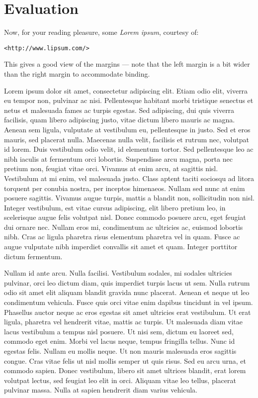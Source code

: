 \chapter{Evaluation}
\label{chap:evaluation}


Now, for your reading pleasure, some \textsl{Lorem ipsum}, courtesy
of:
\begin{center}
\texttt{<http://www.lipsum.com/>}
\end{center}
This gives a good view of the margins --- note that the left margin
is a bit wider than the right margin to accommodate binding.

Lorem ipsum dolor sit amet, consectetur adipiscing elit. Etiam odio elit,
viverra eu tempor non, pulvinar ac nisi. Pellentesque habitant morbi
tristique senectus et netus et malesuada fames ac turpis egestas. Sed
adipiscing, dui quis viverra facilisis, quam libero adipiscing justo,
vitae dictum libero mauris ac magna. Aenean sem ligula, vulputate at
vestibulum eu, pellentesque in justo. Sed et eros mauris, sed placerat
nulla. Maecenas nulla velit, facilisis et rutrum nec, volutpat id
lorem. Duis vestibulum odio velit, id elementum tortor. Sed pellentesque
leo ac nibh iaculis at fermentum orci lobortis. Suspendisse arcu magna,
porta nec pretium non, feugiat vitae orci. Vivamus at enim arcu,
at sagittis nisl. Vestibulum at mi enim, vel malesuada justo. Class
aptent taciti sociosqu ad litora torquent per conubia nostra, per
inceptos himenaeos. Nullam sed nunc at enim posuere sagittis. Vivamus
augue turpis, mattis a blandit non, sollicitudin non nisl. Integer
vestibulum, est vitae cursus adipiscing, elit libero pretium leo,
in scelerisque augue felis volutpat nisl. Donec commodo posuere arcu,
eget feugiat dui ornare nec. Nullam eros mi, condimentum ac ultricies ac,
euismod lobortis nibh. Cras ac ligula pharetra risus elementum pharetra
vel in quam. Fusce ac augue vulputate nibh imperdiet convallis sit amet
et quam. Integer porttitor dictum fermentum.

Nullam id ante arcu. Nulla facilisi. Vestibulum sodales, mi sodales
ultricies pulvinar, orci leo dictum diam, quis imperdiet turpis lacus
ut sem. Nulla rutrum odio sit amet elit aliquam blandit gravida nunc
placerat. Aenean et neque ut leo condimentum vehicula. Fusce quis orci
vitae enim dapibus tincidunt in vel ipsum. Phasellus auctor neque ac eros
egestas sit amet ultricies erat vestibulum. Ut erat ligula, pharetra
vel hendrerit vitae, mattis ac turpis. Ut malesuada diam vitae lacus
vestibulum a tempus nisl posuere. Ut nisi sem, dictum eu laoreet sed,
commodo eget enim. Morbi vel lacus neque, tempus fringilla tellus. Nunc
id egestas felis. Nullam eu mollis neque. Ut non mauris malesuada
eros sagittis congue. Cras vitae felis ut nisl mollis semper ut quis
risus. Sed eu arcu urna, et commodo sapien. Donec vestibulum, libero
sit amet ultrices blandit, erat lorem volutpat lectus, sed feugiat leo
elit in orci. Aliquam vitae leo tellus, placerat pulvinar massa. Nulla
at sapien hendrerit diam varius vehicula.

